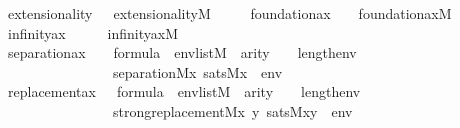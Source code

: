 \begin{isabellebody}
\ \ \ \ \ extensionality{\isacharcolon}{\kern0pt}\ \ \ {\isachardoublequoteopen}extensionality{\isacharparenleft}{\kern0pt}{\isacharhash}{\kern0pt}{\isacharhash}{\kern0pt}M{\isacharparenright}{\kern0pt}{\isachardoublequoteclose}\isanewline
\ \ \ \ \ foundation{\isacharunderscore}{\kern0pt}ax{\isacharcolon}{\kern0pt}\ \ \ \ {\isachardoublequoteopen}foundation{\isacharunderscore}{\kern0pt}ax{\isacharparenleft}{\kern0pt}{\isacharhash}{\kern0pt}{\isacharhash}{\kern0pt}M{\isacharparenright}{\kern0pt}{\isachardoublequoteclose}\isanewline
\ \ \ \ \ infinity{\isacharunderscore}{\kern0pt}ax{\isacharcolon}{\kern0pt}\ \ \ \ \ \ {\isachardoublequoteopen}infinity{\isacharunderscore}{\kern0pt}ax{\isacharparenleft}{\kern0pt}{\isacharhash}{\kern0pt}{\isacharhash}{\kern0pt}M{\isacharparenright}{\kern0pt}{\isachardoublequoteclose}\isanewline
\ \ \ \ \ separation{\isacharunderscore}{\kern0pt}ax{\isacharcolon}{\kern0pt}\ \ \ \ {\isachardoublequoteopen}{\isasymphi}{\isasymin}formula\ {\isasymLongrightarrow}\ env{\isasymin}list{\isacharparenleft}{\kern0pt}M{\isacharparenright}{\kern0pt}\ {\isasymLongrightarrow}\ arity{\isacharparenleft}{\kern0pt}{\isasymphi}{\isacharparenright}{\kern0pt}\ {\isasymle}\ {}\ {\isacharhash}{\kern0pt}{\isacharplus}{\kern0pt}\ length{\isacharparenleft}{\kern0pt}env{\isacharparenright}{\kern0pt}\ {\isasymLongrightarrow}\isanewline
\ \ \ \ \ \ \ \ \ \ \ \ \ \ \ \ \ \ \ \ separation{\isacharparenleft}{\kern0pt}{\isacharhash}{\kern0pt}{\isacharhash}{\kern0pt}M{\isacharcomma}{\kern0pt}{\isasymlambda}x{\isachardot}{\kern0pt}\ sats{\isacharparenleft}{\kern0pt}M{\isacharcomma}{\kern0pt}{\isasymphi}{\isacharcomma}{\kern0pt}{\isacharbrackleft}{\kern0pt}x{\isacharbrackright}{\kern0pt}\ {\isacharat}{\kern0pt}\ env{\isacharparenright}{\kern0pt}{\isacharparenright}{\kern0pt}{\isachardoublequoteclose}\isanewline
\ \ \ \ \ replacement{\isacharunderscore}{\kern0pt}ax{\isacharcolon}{\kern0pt}\ \ \ {\isachardoublequoteopen}{\isasymphi}{\isasymin}formula\ {\isasymLongrightarrow}\ env{\isasymin}list{\isacharparenleft}{\kern0pt}M{\isacharparenright}{\kern0pt}\ {\isasymLongrightarrow}\ arity{\isacharparenleft}{\kern0pt}{\isasymphi}{\isacharparenright}{\kern0pt}\ {\isasymle}\ {}\ {\isacharhash}{\kern0pt}{\isacharplus}{\kern0pt}\ length{\isacharparenleft}{\kern0pt}env{\isacharparenright}{\kern0pt}\ {\isasymLongrightarrow}\isanewline
\ \ \ \ \ \ \ \ \ \ \ \ \ \ \ \ \ \ \ \ strong{\isacharunderscore}{\kern0pt}replacement{\isacharparenleft}{\kern0pt}{\isacharhash}{\kern0pt}{\isacharhash}{\kern0pt}M{\isacharcomma}{\kern0pt}{\isasymlambda}x\ y{\isachardot}{\kern0pt}\ sats{\isacharparenleft}{\kern0pt}M{\isacharcomma}{\kern0pt}{\isasymphi}{\isacharcomma}{\kern0pt}{\isacharbrackleft}{\kern0pt}x{\isacharcomma}{\kern0pt}y{\isacharbrackright}{\kern0pt}\ {\isacharat}{\kern0pt}\ env{\isacharparenright}{\kern0pt}{\isacharparenright}{\kern0pt}{\isachardoublequoteclose}\isanewline

\end{isabellebody}
